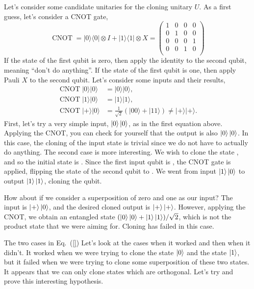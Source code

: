Let's consider some candidate unitaries for the cloning unitary $U$.
As a first guess, let's consider a CNOT gate,
\begin{equation}
    \operatorname{CNOT} =|0\rangle\langle 0|\otimes I+| 1\rangle\langle 1| \otimes X = \begin{pmatrix}
        1 & 0 & 0 & 0 \\
        0 & 1 & 0 & 0 \\
        0 & 0 & 0 & 1 \\
        0 & 0 & 1 & 0 \\
    \end{pmatrix}
\end{equation}
If the state of the first qubit is zero, then apply the identity to the second qubit, meaning ``don't do anything''.
If the state of the first qubit is one, then apply Pauli $X$ to the second qubit.
Let's consider some inputs and their results,
\begin{equation}
\begin{aligned}
    \operatorname{CNOT} |0\rangle|0\rangle &=|0\rangle|0\rangle, \\
    \operatorname{CNOT} |1\rangle|0\rangle &=|1\rangle|1\rangle, \\
    \operatorname{CNOT} |+\rangle|0\rangle &=\frac{1}{\sqrt{2}}(|00\rangle+|11\rangle)\neq|+\rangle|+\rangle.
    \label{eq:cloning_examples_CNOT}
\end{aligned}
\end{equation}
First, let's try a very simple input, $\left| 0 \right\rangle\left| 0 \right\rangle$, as in the first equation above.
Applying the CNOT, you can check for yourself that the output is also $\left| 0 \right\rangle\left| 0 \right\rangle$.
In this case, the cloning of the input state is trivial since we do not have to actually do anything.
The second case is more interesting.
We wish to clone the state , and so the initial state is .
Since the first input qubit is , the CNOT gate is applied, flipping the state of the second qubit to .
We went from input $\left| 1 \right\rangle\left| 0 \right\rangle$ to output $\left| 1 \right\rangle\left| 1 \right\rangle$, cloning the qubit.

How about if we consider a superposition of zero and one as our input? The input is $\left| + \right\rangle\left| 0 \right\rangle$, and the desired cloned output is $\left| + \right\rangle\left| + \right\rangle$.
However, applying the CNOT, we obtain an entangled state $(\left| 0 \right\rangle\left| 0 \right\rangle+\left| 1 \right\rangle\left| 1 \right\rangle)/\sqrt{2}$, which is not the product state that we were aiming for. Cloning has failed in this case.

The two cases in Eq.~(\ref{})
Let's look at the cases when it worked and then when it didn't. It worked when we were trying to clone the state $\left| 0 \right\rangle$ and the state $\left| 1 \right\rangle$, but it failed when we were trying to clone some superposition of these two states. It appears that we can only clone states which are orthogonal. Let's try and prove this interesting hypothesis.

